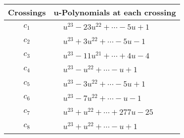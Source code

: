 \documentclass[1p]{elsarticle_modified}
\theoremstyle{definition}
\begin{document}
\begin{tabular}{m{50pt}|m{274pt}}
Crossings & \hspace{64pt}u-Polynomials at each crossing \\
\hline $$\begin{aligned}c_{1}\end{aligned}$$&$\begin{aligned}
&u^{23}-23 u^{22}+\cdots-5 u+1
\end{aligned}$\\
\hline $$\begin{aligned}c_{2}\end{aligned}$$&$\begin{aligned}
&u^{23}+3 u^{22}+\cdots-5 u-1
\end{aligned}$\\
\hline $$\begin{aligned}c_{3}\end{aligned}$$&$\begin{aligned}
&u^{23}-11 u^{21}+\cdots+4 u-4
\end{aligned}$\\
\hline $$\begin{aligned}c_{4}\end{aligned}$$&$\begin{aligned}
&u^{23}- u^{22}+\cdots- u+1
\end{aligned}$\\
\hline $$\begin{aligned}c_{5}\end{aligned}$$&$\begin{aligned}
&u^{23}-3 u^{22}+\cdots-5 u+1
\end{aligned}$\\
\hline $$\begin{aligned}c_{6}\end{aligned}$$&$\begin{aligned}
&u^{23}-7 u^{22}+\cdots- u-1
\end{aligned}$\\
\hline $$\begin{aligned}c_{7}\end{aligned}$$&$\begin{aligned}
&u^{23}+u^{22}+\cdots+277 u-25
\end{aligned}$\\
\hline $$\begin{aligned}c_{8}\end{aligned}$$&$\begin{aligned}
&u^{23}+u^{22}+\cdots- u+1
\end{aligned}$\\

\end{tabular}
\end{document}
